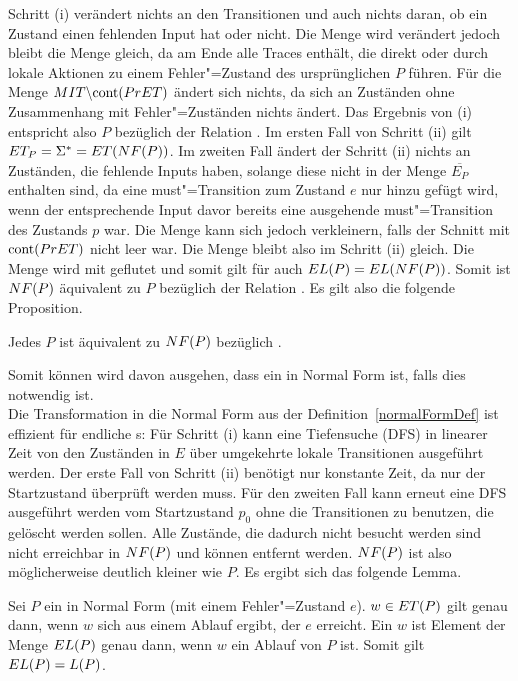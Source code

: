 Schritt (i) verändert nichts an den Transitionen und auch nichts daran, ob ein
Zustand einen fehlenden Input hat oder nicht. Die Menge \StET{} wird verändert
jedoch bleibt die Menge \PrET{} gleich, da \StET{} am Ende alle Traces enthält,
die direkt oder durch lokale Aktionen zu einem Fehler"=Zustand des
ursprünglichen $P$ führen. Für die Menge $MIT\backslash\mathrm{cont} (PrET)$ ändert
sich nichts, da sich an Zuständen ohne Zusammenhang mit Fehler"=Zuständen
nichts ändert. Das Ergebnis von (i) entspricht also $P$ bezüglich der Relation
\ERel{}. Im ersten Fall von Schritt (ii) gilt $ET _P =\Sigma ^* = ET (NF
(P))$. Im zweiten Fall ändert der Schritt (ii) nichts an Zuständen, die
fehlende Inputs haben, solange diese nicht in der Menge $\overline{E_P}$
enthalten sind, da eine must"=Transition zum Zustand $e$ nur hinzu gefügt
wird, wenn der entsprechende Input davor bereits eine ausgehende
must"=Transition des Zustands $p$ war. Die Menge \MIT{} kann sich jedoch
verkleinern, falls der Schnitt mit $\mathrm{cont} (PrET)$ nicht leer war. Die Menge
\ET bleibt also im Schritt (ii) gleich. Die Menge \EL wird mit \ET geflutet und
somit gilt für \EL auch $EL (P) = EL (NF (P))$. Somit ist $NF (P)$
äquivalent zu $P$ bezüglich der Relation \ERel{}. Es gilt also die folgende
Proposition.

\begin{Prop}
  \label{normalFormProp}
  Jedes \MEIO{} $P$ ist äquivalent zu $NF (P)$ bezüglich \ERel{}.
\end{Prop}

Somit können wird davon ausgehen, dass ein \MEIO{} in Normal Form ist, falls
dies notwendig ist.\\
Die Transformation in die Normal Form aus der Definition~\ref{normalFormDef}
ist effizient für endliche \MEIO{}s: Für Schritt (i)  kann eine Tiefensuche
(DFS) in linearer Zeit von den Zuständen in $E$ über umgekehrte lokale
Transitionen ausgeführt werden. Der erste Fall von Schritt (ii) benötigt nur
konstante Zeit, da nur der Startzustand überprüft werden muss. Für den zweiten
Fall kann erneut eine DFS ausgeführt werden vom Startzustand $p_0$ ohne die
Transitionen zu benutzen, die gelöscht werden sollen. Alle Zustände, die
dadurch nicht besucht werden sind nicht erreichbar in $NF (P)$ und können
entfernt werden. $NF (P)$ ist also möglicherweise deutlich kleiner wie $P$. Es
ergibt sich das folgende Lemma.

\begin{Lem}
  Sei $P$ ein \MEIO{} in Normal Form (mit einem Fehler"=Zustand $e$). $w\in
  ET (P)$ gilt genau dann, wenn $w$ sich aus einem Ablauf ergibt, der $e$
  erreicht. Ein $w$ ist Element der Menge $EL (P)$ genau dann, wenn $w$ ein
  Ablauf von $P$ ist. Somit gilt $EL (P) = L(P)$.
\end{Lem}

